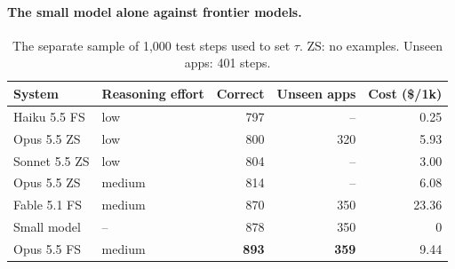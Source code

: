 \documentclass[10pt]{article}
\begin{document}
\paragraph{The small model alone against frontier models.} 
\begin{table}[t]\centering\small
\caption{The separate sample of 1{,}000 test steps used to set $\tau$. ZS: no examples. Unseen apps: 401 steps.}\label{tab:frontier}
\begin{tabular}{llrrr}\toprule
System & Reasoning effort & Correct & Unseen apps & Cost (\$/1k)\\\midrule
Haiku 5.5 FS & low & 797 & -- & 0.25\\
Opus 5.5 ZS & low & 800 & 320 & 5.93\\
Sonnet 5.5 ZS & low & 804 & -- & 3.00\\
Opus 5.5 ZS & medium & 814 & -- & 6.08\\
Fable 5.1 FS & medium & 870 & 350 & 23.36\\
Small model & -- & 878 & 350 & 0\\
Opus 5.5 FS & medium & \textbf{893} & \textbf{359} & 9.44\\\bottomrule
\end{tabular}\end{table}
\end{document}
